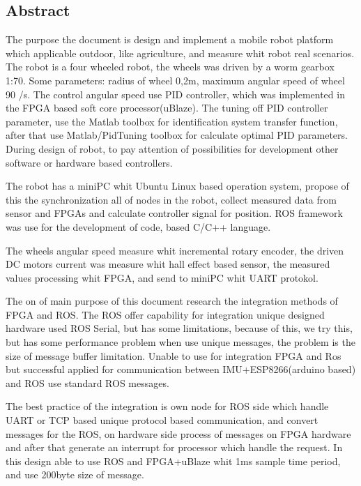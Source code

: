 \begin{titlepage}

\section*{Abstract}

The purpose the document is design and implement a mobile robot platform which applicable outdoor, like agriculture, and measure whit robot real scenarios. The robot is a four wheeled robot, the wheels was driven by a worm gearbox 1:70. Some parameters: radius of wheel 0,2m, maximum angular speed of wheel 90 \degree/s. The control angular speed use PID controller, which was implemented in the FPGA based soft core processor(uBlaze). The tuning off PID controller parameter, use the Matlab toolbox for identification system transfer function, after that use Matlab/PidTuning toolbox for calculate optimal PID parameters. During design of robot, to pay attention of possibilities for development other software or hardware based controllers. 

The robot has a miniPC whit Ubuntu Linux based operation system, propose of this the synchronization all of nodes in the robot, collect measured data from sensor and FPGAs and calculate controller signal for position. ROS framework was use for the development of code, based C/C++ language.

The wheels angular speed measure whit incremental rotary encoder, the driven DC motors current was measure whit hall effect based sensor, the measured values processing whit FPGA, and send to miniPC whit UART protokol.

The on of main purpose of this document research the integration methods of FPGA and ROS. The ROS offer capability for integration unique designed hardware used ROS Serial, but has some limitations, because of this, we try this, but has some performance problem when use unique messages, the problem is the size of message buffer limitation. Unable to use for integration FPGA and Ros but successful applied for communication between IMU+ESP8266(arduino based) and ROS use standard ROS messages.

The best practice of the integration is own node for ROS side which handle UART or TCP based unique protocol based communication, and convert messages for the ROS, on hardware side process of messages on FPGA hardware and after that generate an interrupt for processor which handle the request. In this design able to use ROS and FPGA+uBlaze whit 1ms sample time period, and use 200byte size of message.


\end{titlepage}
